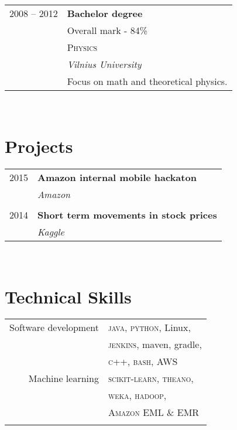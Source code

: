 \documentclass[10pt]{article} %
\begin{document}
{\begin{minipage}[t]{0.44\textwidth}
\begin{tabular}{rl}
2008 -- 2012 & \textbf{Bachelor degree}\\
& \small Overall mark - 84\% \\
& \textsc{Physics} \\ 
& \textit{Vilnius University} \\
& \small Focus on math and theoretical physics. \\
	

\end{tabular}\\[10pt]


\section{Projects} 

\begin{tabular}{rl}

2015     & \textbf{Amazon internal mobile hackaton}\\
& \textit{Amazon}\\
&\\
2014	 & \textbf{Short term movements in stock prices}\\
& \textit{Kaggle}

\end{tabular}\\[10pt]


\section{Technical Skills} 

\begin{tabular}{rl}
Software development
& \textsc{java}, \textsc{python}, Linux,\\
& \textsc{jenkins}, maven, gradle,\\
& \textsc{c++}, \textsc{bash}, \textsc{AWS}\\
Machine learning
& \textsc{scikit-learn}, \textsc{theano},\\
& \textsc{weka}, \textsc{hadoop},\\
& \textsc{Amazon EML \& EMR} \\
& \\
\end{tabular}


\end{minipage}}
\end{document}
